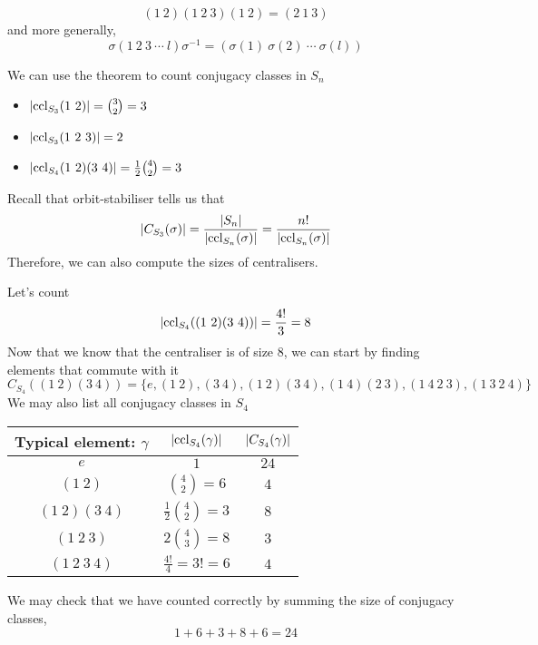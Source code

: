 \documentclass{article}
\begin{document}

\begin{eg}
    \[
        (1\ 2)(1\ 2\ 3)(1\ 2) = (2\ 1\ 3)
    \]
    and more generally,
    \[
        \sigma (1\ 2\ 3\ \cdots\ l) \sigma^{-1} = (\sigma(1)\ \sigma(2)\ \cdots\ \sigma(l))  
    \]
\end{eg}

We can use the theorem to count conjugacy classes in $S_n$
\begin{eg}\leavevmode
    \begin{itemize}
        \item $\left\lvert \operatorname{ccl}_{S_3}(1\ 2)\right\rvert = \binom{3}{2} = 3$
        \item $\left\lvert \operatorname{ccl}_{S_3}(1\ 2\ 3)\right\rvert = 2$
        \item $\left\lvert \operatorname{ccl}_{S_4}(1\ 2)(3\ 4)\right\rvert = \frac{1}{2} \binom{4}{2} = 3$ 
    \end{itemize}
\end{eg}

Recall that orbit-stabiliser tells us that
\[
    \left\lvert C_{S_3}(\sigma)\right\rvert = \frac{\left\lvert S_n\right\rvert}{\left\lvert \operatorname{ccl}_{S_n}(\sigma)\right\rvert} = \frac{n!}{\left\lvert \operatorname{ccl}_{S_n}(\sigma)\right\rvert}
\]
Therefore, we can also compute the sizes of centralisers.
\begin{eg}
    Let's count
    \[
        \abs{\ccl_{S_4}((1\ 2)(3\ 4))} = \frac{4!}{3} = 8
    \]
    Now that we know that the centraliser is of size $8$, we can start by finding elements that commute with it
    \[
        C_{S_4}((1\ 2)(3\ 4)) = \{e, (1\ 2), (3\ 4), (1\ 2)(3\ 4), (1\ 4)(2\ 3), (1\ 4\ 2\ 3), (1\ 3\ 2\ 4)\}
    \]
    We may also list all conjugacy classes in $S_4$
    \begin{center}
    \begin{tabular}{c | c | c}
        Typical element: $\gamma$ & $\left\lvert \operatorname{ccl}_{S_4}(\gamma)\right\rvert$ & $\left\lvert C_{S_4}(\gamma)\right\rvert$ \\
        \hline
        $e$ & $1$ & $24$ \\[10pt]
        $(1\ 2)$ & $\binom{4}{2} = 6$ & $4$ \\[10pt]
        $(1\ 2)(3\ 4)$ & $\frac{1}{2} \binom{4}{2} = 3$ & $8$ \\[10pt]
        $(1\ 2\ 3)$ & $2 \binom{4}{3} = 8$ & $3$ \\[10pt]
        $(1\ 2\ 3\ 4)$ & $\frac{4!}{4} = 3! = 6$ & $4$
    \end{tabular}
    \end{center}
    We may check that we have counted correctly by summing the size of conjugacy classes,
    \[
        1 + 6 + 3 + 8 + 6 = 24    
    \]
\end{eg}
\end{document}
